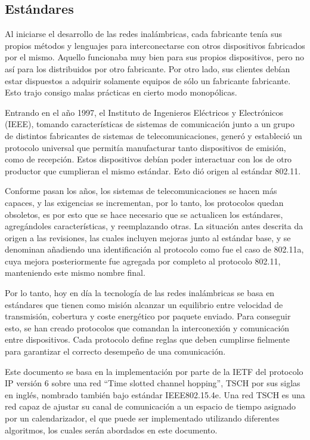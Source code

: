 \subsection{Estándares}

Al iniciarse el desarrollo de las redes inalámbricas, cada fabricante tenía sus propios métodos y lenguajes para interconectarse con otros dispositivos fabricados por el mismo. Aquello funcionaba muy bien para sus propios dispositivos, pero no así para los distribuidos por otro fabricante. Por otro lado, sus clientes debían estar dispuestos a adquirir solamente equipos de sólo un fabricante fabricante. Esto trajo consigo malas prácticas en cierto modo monopólicas.

Entrando en el año 1997, el Instituto de Ingenieros Eléctricos y Electrónicos (IEEE), tomando características de sistemas de comunicación junto a un grupo de distintos fabricantes de sistemas de telecomunicaciones, generó y estableció un protocolo universal que permitía manufacturar tanto dispositivos de emisión, como de recepción. Estos dispositivos debían poder interactuar con los de otro productor que cumplieran el mismo estándar. Esto dió origen al estándar 802.11. \cite{crow1997ieee}

Conforme pasan los años, los sistemas de telecomunicaciones se hacen más capaces, y las exigencias se incrementan, por lo tanto, los protocolos quedan obsoletos, es por esto que se hace necesario que se actualicen los estándares, agregándoles características, y reemplazando otras. La situación antes descrita da origen a las revisiones, las cuales incluyen mejoras junto al estándar base, y se denominan añadiendo una identificación al protocolo como fue el caso de 802.11a, cuya mejora posteriormente fue agregada por completo al protocolo 802.11, manteniendo este mismo nombre final.

Por lo tanto, hoy en día la tecnología de las redes inalámbricas se basa en estándares que tienen como misión alcanzar un equilibrio entre velocidad de transmisión, cobertura y coste energético por paquete enviado. Para conseguir esto, se han creado protocolos que comandan la interconexión y comunicación entre dispositivos. Cada protocolo define reglas que deben cumplirse fielmente para garantizar el correcto desempeño de una comunicación. 

Este documento se basa en la implementación por parte de la IETF del protocolo IP versión 6 sobre una red “Time slotted channel hopping”, TSCH por sus siglas en inglés, nombrado también bajo estándar IEEE802.15.4e. Una red TSCH es una red capaz de ajustar su canal de comunicación a un espacio de tiempo asignado por un calendarizador, el que puede ser implementado utilizando diferentes algoritmos, los cuales serán abordados en este documento. \cite{dujovne20146tisch}

